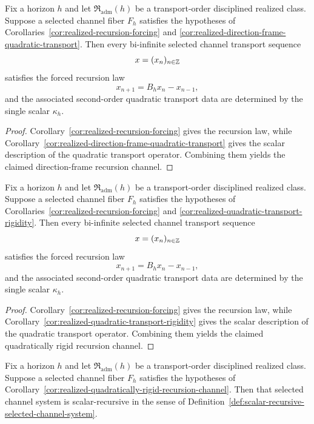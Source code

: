 \begin{corollary}
\label{cor:realized-direction-frame-recursion-channel}
Fix a horizon $h$ and let $\mathfrak R_{\mathrm{adm}}(h)$ be a transport-order
disciplined realized class. Suppose a selected channel fiber $F_h$ satisfies
the hypotheses of Corollaries~\ref{cor:realized-recursion-forcing} and
\ref{cor:realized-direction-frame-quadratic-transport}. Then every bi-infinite
selected channel transport sequence
\[
x=(x_n)_{n\in\mathbb{Z}}
\]
satisfies the forced recursion law
\[
x_{n+1}=B_hx_n-x_{n-1},
\]
and the associated second-order quadratic transport data are determined by the
single scalar $\kappa_h$.
\end{corollary}

\begin{proof}
Corollary~\ref{cor:realized-recursion-forcing} gives the recursion law, while
Corollary~\ref{cor:realized-direction-frame-quadratic-transport} gives the
scalar description of the quadratic transport operator. Combining them yields
the claimed direction-frame recursion channel.
\end{proof}

\begin{corollary}
\label{cor:realized-quadratically-rigid-recursion-channel}
Fix a horizon $h$ and let $\mathfrak R_{\mathrm{adm}}(h)$ be a transport-order
disciplined realized class. Suppose a selected channel fiber $F_h$ satisfies
the hypotheses of Corollaries~\ref{cor:realized-recursion-forcing} and
\ref{cor:realized-quadratic-transport-rigidity}. Then every bi-infinite
selected channel transport sequence
\[
x=(x_n)_{n\in\mathbb{Z}}
\]
satisfies the forced recursion law
\[
x_{n+1}=B_hx_n-x_{n-1},
\]
and the associated second-order quadratic transport data are determined by the
single scalar $\kappa_h$.
\end{corollary}

\begin{proof}
Corollary~\ref{cor:realized-recursion-forcing} gives the recursion law, while
Corollary~\ref{cor:realized-quadratic-transport-rigidity} gives the scalar
description of the quadratic transport operator. Combining them yields the
claimed quadratically rigid recursion channel.
\end{proof}

\begin{corollary}
\label{cor:quadratically-rigid-yields-scalar-recursive}
Fix a horizon $h$ and let $\mathfrak R_{\mathrm{adm}}(h)$ be a transport-order
disciplined realized class. Suppose a selected channel fiber $F_h$ satisfies
the hypotheses of
Corollary~\ref{cor:realized-quadratically-rigid-recursion-channel}. Then that
selected channel system is scalar-recursive in the sense of
Definition~\ref{def:scalar-recursive-selected-channel-system}.
\end{corollary}

